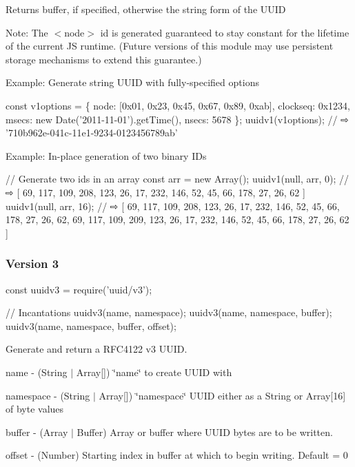 Returns {\ttfamily buffer}, if specified, otherwise the string form of the U\+U\+ID

Note\+: The $<$node$>$ id is generated guaranteed to stay constant for the lifetime of the current JS runtime. (Future versions of this module may use persistent storage mechanisms to extend this guarantee.)

Example\+: Generate string U\+U\+ID with fully-\/specified options


\begin{DoxyCode}
const v1options = \{
  node: [0x01, 0x23, 0x45, 0x67, 0x89, 0xab],
  clockseq: 0x1234,
  msecs: new Date('2011-11-01').getTime(),
  nsecs: 5678
\};
uuidv1(v1options); // ⇨ '710b962e-041c-11e1-9234-0123456789ab'
\end{DoxyCode}


Example\+: In-\/place generation of two binary I\+Ds


\begin{DoxyCode}
// Generate two ids in an array
const arr = new Array();
uuidv1(null, arr, 0);  // ⇨ [ 69, 117, 109, 208, 123, 26, 17, 232, 146, 52, 45, 66, 178, 27, 26, 62 ]
uuidv1(null, arr, 16); // ⇨ [ 69, 117, 109, 208, 123, 26, 17, 232, 146, 52, 45, 66, 178, 27, 26, 62, 69,
       117, 109, 209, 123, 26, 17, 232, 146, 52, 45, 66, 178, 27, 26, 62 ]
\end{DoxyCode}


\subsubsection*{Version 3}


\begin{DoxyCode}
const uuidv3 = require('uuid/v3');

// Incantations
uuidv3(name, namespace);
uuidv3(name, namespace, buffer);
uuidv3(name, namespace, buffer, offset);
\end{DoxyCode}


Generate and return a R\+F\+C4122 v3 U\+U\+ID.


\begin{DoxyItemize}
\item {\ttfamily name} -\/ (String $\vert$ Array\mbox{[}\mbox{]}) \char`\"{}name\char`\"{} to create U\+U\+ID with
\item {\ttfamily namespace} -\/ (String $\vert$ Array\mbox{[}\mbox{]}) \char`\"{}namespace\char`\"{} U\+U\+ID either as a String or Array\mbox{[}16\mbox{]} of byte values
\item {\ttfamily buffer} -\/ (Array $\vert$ Buffer) Array or buffer where U\+U\+ID bytes are to be written.
\item {\ttfamily offset} -\/ (Number) Starting index in {\ttfamily buffer} at which to begin writing. Default = 0
\end{DoxyItemize}

